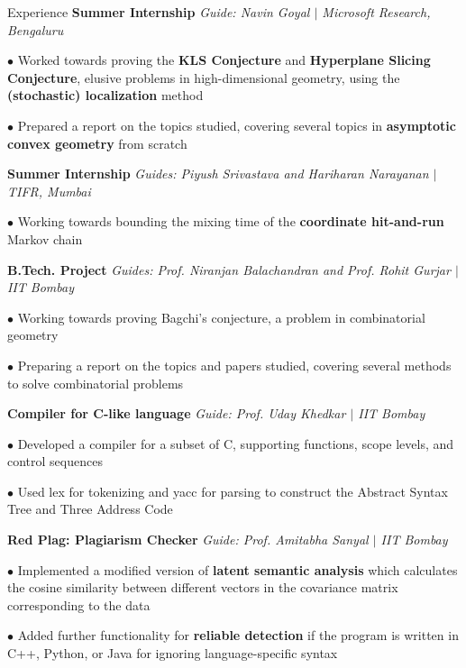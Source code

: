 \begin{rubric}{Experience}
    \entry*[2021] \textbf{Summer Internship} \hfill \emph{Guide: Navin Goyal $\mid$ Microsoft Research, Bengaluru}
        
        $\bullet$ Worked towards proving the \textbf{KLS Conjecture} and \textbf{Hyperplane Slicing Conjecture}, elusive problems in high-dimensional geometry, using the \textbf{(stochastic) localization} method

        $\bullet$ Prepared a report on the topics studied, covering several topics in \textbf{asymptotic convex geometry} from scratch

    \entry*[2022] \textbf{Summer Internship} \hfill \emph{Guides: Piyush Srivastava and Hariharan Narayanan $\mid$ TIFR, Mumbai}

        $\bullet$ Working towards bounding the mixing time of the \textbf{coordinate hit-and-run} Markov chain

    \entry*[\phantom{.}2022] \textbf{B.Tech. Project} \hfill \emph{Guides: Prof. Niranjan Balachandran and Prof. Rohit Gurjar $\mid$ IIT Bombay}

        $\bullet$ Working towards proving Bagchi's conjecture, a problem in combinatorial geometry

        $\bullet$ Preparing a report on the topics and papers studied, covering several methods to solve combinatorial problems

    \entry*[2022] \textbf{Compiler for C-like language} \hfill \emph{Guide: Prof. Uday Khedkar $\mid$ IIT Bombay}

        $\bullet$ Developed a compiler for a subset of C, supporting functions, scope levels, and control sequences

        $\bullet$ Used lex for tokenizing and yacc for parsing to construct the Abstract Syntax Tree and Three Address Code 

    \entry*[2020] \textbf{Red Plag: Plagiarism Checker} \hfill \emph{Guide: Prof. Amitabha Sanyal $\mid$ IIT Bombay}
	    
	    $\bullet$ Implemented a modified version of \textbf{latent semantic analysis} which calculates the cosine similarity between different vectors in the covariance matrix corresponding to the data
        
        $\bullet$ Added further functionality for \textbf{reliable detection} if the program is written in C++, Python, or Java for ignoring language-specific syntax


\end{rubric}
